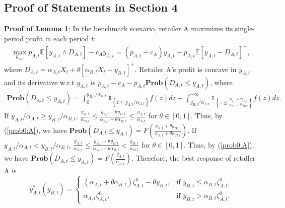 \documentclass[nonblindrev,copyedit]{informs1}
\begin{document}
\begin{APPENDICES}
\subsection{Proof of Statements in Section 4}
{\bf Proof of Lemma 1}: In the benchmark scenario, retailer A maximizes its single-period profit in each period $t$:
\begin{eqnarray*} \label{model0:A}
    \max_{y_{A,t}} p_{A,t} \mathbb{E}\left[y_{A,t} \wedge D_{A,t}  \right] - c_A y_{A,t} = (p_{A,t} - c_A )y_{A,t} - p_{A,t} \mathbb{E} \left[y_{A,t} - D_{A,t}  \right]^+,
\end{eqnarray*}
where $D_{A,t} = \alpha_{A,t} X_t + \theta \left[\alpha_{B,t} X_t - y_{B,t} \right]^+$. Retailer A's profit is concave in $y_{A,t}$ and its derivative w.r.t $y_{A,t}$ is $p_{A,t} - c_A - p_{A,t} \mathbf{Prob} \left(D_{A,t} \leq y_{A,t} \right)$, where
\begin{eqnarray} \label{prob0:A}
    \mathbf{Prob} \left(D_{A,t} \leq y_{A,t} \right)
     =  \int_{0}^{y_{B,t}/\alpha_{B,t}} \mathbb{1}_{ \left \{z \leq y_{A,t}/\alpha_{A,t} \right \} } f(z) dz + \int_{y_{B,t}/\alpha_{B,t}}^{+\infty} \mathbb{1}_{ \left \{z \leq \frac{y_{A,t}+\theta y_{B,t}}{\alpha_{A,t}+\theta \alpha_{B,t}}  \right \} } f(z) dz.
\end{eqnarray}
If $y_{A,t}/\alpha_{A,t} \geq y_{B,t}/\alpha_{B,t}$, $\frac{y_{B,t}}{\alpha_{B,t}} \leq \frac{y_{A,t}+\theta y_{B,t}}{\alpha_{A,t}+\theta \alpha_{B,t}}  \leq \frac{y_{A,t}}{\alpha_{A,t}}$ for $\theta \in [0,1]$. Thus, by (\ref{prob0:A}), we have $\mathbf{Prob} \left(D_{A,t} \leq y_{A,t} \right) = F\left(\frac{y_{A,t}+\theta y_{B,t}}{\alpha_{A,t}+\theta \alpha_{B,t}}\right)$. If $y_{A,t}/\alpha_{A,t} < y_{B,t}/\alpha_{B,t}$, $\frac{y_{A,t}}{\alpha_{A,t}} \leq \frac{y_{A,t}+\theta y_{B,t}}{\alpha_{A,t}+\theta \alpha_{B,t}} < \frac{y_{B,t}}{\alpha_{B,t}}$ for $\theta \in [0,1]$. Thus, by (\ref{prob0:A}), we have $\mathbf{Prob} \left(D_{A,t} \leq y_{A,t} \right) = F\left(\frac{y_{A,t}}{\alpha_{A,t}}\right)$. Therefore, the best response of retailer A is
\begin{equation} \label{model0:BRA}
    y^*_{A,t}(y_{B,t}) =  \begin{cases}
        (\alpha_{A,t} + \theta \alpha_{B,t}) \zeta^0_{A,t} - \theta y_{B,t}, &  \text{if $y_{B,t} \leq \alpha_{B,t} \zeta^0_{A,t}$,} \\
        \alpha_{A,t} \zeta^0_{A,t}, &  \text{if $y_{B,t} > \alpha_{B,t} \zeta^0_{A,t}$,}
    \end{cases}
\end{equation}

\end{APPENDICES}
\end{document}
